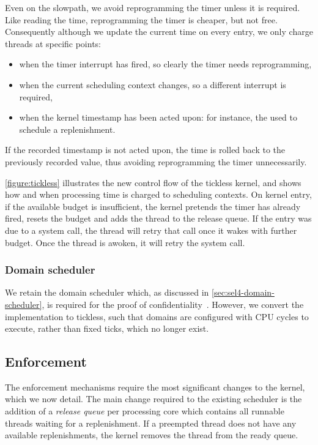 Even on the slowpath, we avoid reprogramming the timer unless it is required. Like reading the time, 
reprogramming the timer is cheaper, but not free. Consequently although we update the current time
on every entry, we only charge threads at specific points:
\begin{itemize}
\item when the timer interrupt has fired, so clearly the timer needs reprogramming,
\item when the current scheduling context changes, so a different interrupt is required,
\item when the kernel timestamp has been acted upon: for instance, the used to schedule a
    replenishment.
\end{itemize}
If the recorded timestamp is not acted upon, the time is rolled back to the previously recorded value,
thus avoiding reprogramming the timer unnecessarily.

\cref{figure:tickless} illustrates the new control flow of the tickless kernel, and shows
how and when processing time is charged to scheduling contexts.
On kernel entry, if the available budget is insufficient, the kernel pretends the timer has already fired,
resets the budget and adds the thread to the release queue. If the entry was due to a system call,
the thread will retry that call once it wakes with further budget.
Once the thread is awoken, it will retry the system call.

\subsubsection{Domain scheduler}

We retain the domain scheduler which, as discussed in \cref{sec:sel4-domain-scheduler}, is required
for the proof of confidentiality~\citep{Murray_MBGBSLGK_13}. However, we convert the 
implementation to tickless, such that domains are
configured with CPU cycles to execute, rather than fixed ticks, which no longer exist.

\subsection{Enforcement}

The enforcement mechanisms require the most significant changes to the kernel, which we now detail.
The main change required to the existing scheduler is the addition of a \emph{release queue} per
processing core which contains all runnable threads waiting for a replenishment. If a
preempted thread does not have any available replenishments, the kernel removes the thread from the
ready queue.

